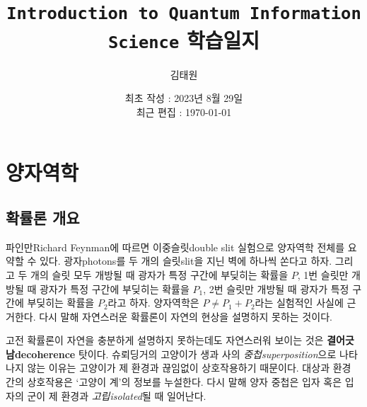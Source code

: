 \documentclass[a4paper,chapter,atbegshi]{oblivoir}
\title{\texttt{Introduction to Quantum Information Science} 학습일지}
\author{김태원}
\date{최초 작성 : 2023년 8월 29일 \\ 최근 편집 : \today}
\begin{document}
\maketitle
\break
\tableofcontents
\chapter{양자역학}
\section{확률론 개요}
파인만{\tiny Richard Feynman}에 따르면 이중슬릿{\tiny double slit} 실험으로
양자역학 전체를 요약할 수 있다. 광자{\tiny photons}를 두 개의 슬릿{\tiny slit}을
지닌 벽에 하나씩 쏜다고 하자. 그리고 두 개의 슬릿 모두 개방될 때 광자가 특정
구간에 부딪히는 확률을 $P$, 1번 슬릿만 개방될 때 광자가 특정 구간에 부딪히는
확률을 $P_1$, 2번 슬릿만 개방될 때 광자가 특정 구간에 부딪히는 확률을 $P_2$라고
하자. 양자역학은 $P\neq P_1+P_2$라는 실험적인 사실에 근거한다. 다시 말해
자연스러운 확률론이 자연의 현상을 설명하지 못하는 것이다.

고전 확률론이 자연을 충분하게 설명하지 못하는데도 자연스러워 보이는 것은 
\textbf{결어긋남\tiny decoherence} 탓이다. 슈뢰딩거의 고양이가 생과 사의
\emph{중첩\tiny superposition}으로 나타나지 않는 이유는 고양이가 제 환경과
끊임없이 상호작용하기 때문이다. 대상과 환경 간의 상호작용은 `고양이 계'의 
정보를 누설한다. 다시 말해 양자 중첩은 입자 혹은 입자의 군이 제 환경과
\emph{고립\tiny isolated}될 때 일어난다.
\end{document}
